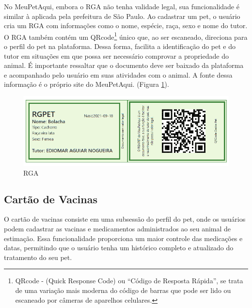 No MeuPetAqui, embora o RGA não tenha validade legal, sua funcionalidade é similar à aplicada pela prefeitura de São Paulo. Ao cadastrar um pet, o usuário cria um RGA com informações como o nome, espécie, raça, sexo e nome do tutor. O RGA também contém um QRcode\footnote{QRcode - (Quick Response Code) ou “Código de Resposta Rápida”, se trata de uma variação mais moderna do código de barras que pode ser lido ou escaneado por câmeras de aparelhos celulares.
} único que, ao ser escaneado, direciona para o perfil do pet na plataforma. Dessa forma, facilita a identificação do pet e do tutor em situações em que possa ser necessário comprovar a propriedade do animal. É importante ressaltar que o documento deve ser baixado da plataforma e acompanhado pelo usuário em suas atividades com o animal. A fonte dessa informação é o próprio site do MeuPetAqui. (Figura \ref{fig:RGA}).

\begin{figure}[htb]
     \centering
     \includegraphics[width=15cm]{arquivos/Figuras/image18.png}
     \caption{RGA}
         \label{fig:RGA}
\end{figure}

\newpage
\subsection{Cartão de Vacinas}
O cartão de vacinas consiste em uma subsessão do perfil do pet, onde os usuários podem cadastrar as vacinas e medicamentos administrados ao seu animal de estimação. Essa funcionalidade proporciona um maior controle das medicações e datas, permitindo que o usuário tenha um histórico completo e atualizado do tratamento do seu pet.


